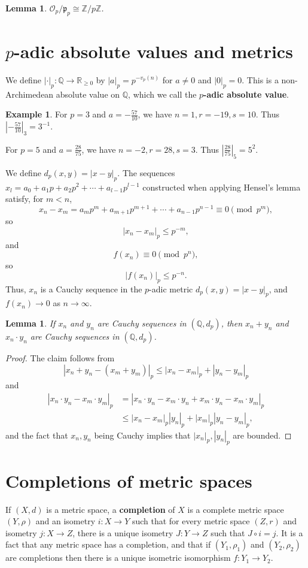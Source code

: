 \documentclass{article}
\newtheorem{lemma}[theorem]{Lemma}
\theoremstyle{definition}
\newtheorem{example}[theorem]{Example}
\begin{document}
\begin{lemma}
$\mathcal{O}_p/\mathfrak{p}_p \cong \mathbb{Z}/p\mathbb{Z}$.
\end{lemma}


\section{$p$-adic absolute values and metrics}
We define $|\cdot|_p:\mathbb{Q} \to \mathbb{R}_{\geq 0}$ by $|a|_p=p^{-v_p(n)}$ for $a \neq 0$ and $|0|_p=0$. 
This is a non-Archimedean absolute value on $\mathbb{Q}$, which we call
 the \textbf{$p$-adic absolute value}. 

\begin{example}
For 
$p=3$ and 
$a=-\frac{57}{10}$,
we have $n=1, r=-19, s=10$. 
Thus
$\left|-\frac{57}{10}\right|_3=3^{-1}$.

For $p=5$ and $a=\frac{28}{75}$, we have $n=-2, r=28, s=3$. Thus 
$\left| \frac{28}{75} \right|_5 = 5^2$.
\end{example}

We define $d_p(x,y)=|x-y|_p$.  The sequences $x_l = a_0+a_1p+a_2p^2+\cdots+a_{l-1} p^{l-1}$ constructed when applying Hensel's
lemma satisfy, for $m < n$,
\[
x_n-x_m = a_mp^m+a_{m+1}p^{m+1}+\cdots
+a_{n-1}p^{n-1} \equiv 0 \pmod{p^m},
\]
so
\[
|x_n-x_m|_p \leq p^{-m},
\]
and 
\[
f(x_n) \equiv 0 \pmod{p^n},
\]
so
\[
|f(x_n)|_p \leq p^{-n}.
\]
Thus, $x_n$ is a Cauchy sequence in the $p$-adic metric $d_p(x,y)=|x-y|_p$, and 
$f(x_n) \to 0$ as $n \to \infty$. 

\begin{lemma}
If $x_n$ and $y_n$ are  Cauchy sequences
in $(\mathbb{Q},d_p)$, then $x_n+y_n$ and $x_n\cdot y_n$ are Cauchy sequences in
$(\mathbb{Q},d_p)$.
\label{cauchysum}
\end{lemma}
\begin{proof}
The claim follows from
\[
|x_n+y_n-(x_m+y_m)|_p
\leq |x_n-x_m|_p + |y_n-y_m|_p
\]
and
\begin{align*}
|x_n\cdot y_n - x_m\cdot y_m|_p &=|x_n \cdot y_n - x_m \cdot y_n
+x_m\cdot y_n  - x_m \cdot y_m|_p\\
&\leq |x_n-x_m|_p |y_n|_p + |x_m|_p |y_n-y_m|_p,
\end{align*}
and the fact that $x_n,y_n$ being Cauchy implies that $|x_n|_p,|y_n|_p$ are bounded. 
\end{proof}


\section{Completions of metric spaces}
If $(X,d)$ is a metric space, a \textbf{completion} of $X$ is a complete metric space $(Y,\rho)$ and an
isometry $i:X \to Y$ such that for every metric space $(Z,r)$ and isometry $j:X \to Z$, there is a unique
isometry $J:Y \to Z$ such that $J \circ i = j$. It is a fact that any metric space has a completion,
and that if $(Y_1,\rho_1)$ and $(Y_2,\rho_2)$ are completions then there is a unique
isometric isomorphism $f:Y_1 \to Y_2$. 
\end{document}
